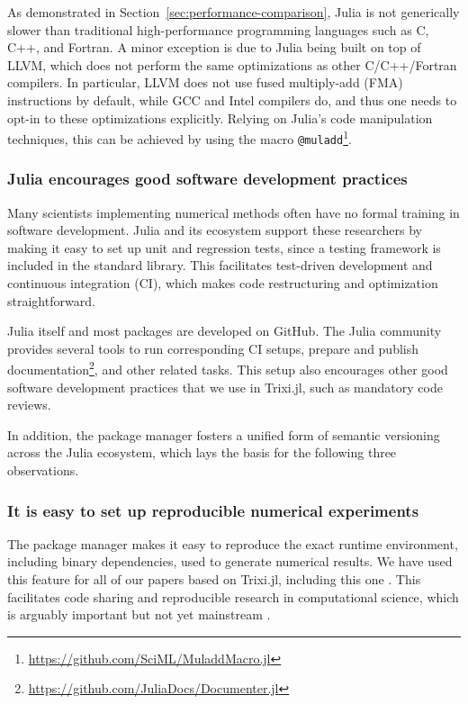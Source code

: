 \documentclass[hidelinks]{juliacon} %
\newcommand{\trixi}{Trixi.jl\xspace}
\begin{document}
As demonstrated in Section~\ref{sec:performance-comparison},
Julia is not generically slower than traditional high-performance programming
languages such as C, C++, and Fortran. A minor exception is due to
Julia being built on top of LLVM, which does not perform the same optimizations as other
C/C++/Fortran compilers. In particular, LLVM does
not use fused multiply-add (FMA) instructions by default, while GCC and Intel
compilers do, and thus one needs to opt-in to these optimizations explicitly.
Relying on Julia's code manipulation techniques, this can be achieved by using the macro
\lstinline{@muladd}\footnote{\url{https://github.com/SciML/MuladdMacro.jl}}.

\subsubsection{Julia encourages good software development practices}

Many scientists implementing numerical methods often have no formal training
in software development. Julia and its ecosystem support these
researchers by making it easy to set up unit and regression tests, since a
testing framework is included in the standard library. This facilitates test-driven
development and continuous integration (CI), which makes code restructuring
and optimization straightforward.

Julia itself and most packages are developed on GitHub. The Julia community provides
several tools to run corresponding CI setups, prepare and publish
documentation\footnote{\url{https://github.com/JuliaDocs/Documenter.jl}},
and other related tasks. This setup also encourages other good software development
practices that we use in \trixi, such as mandatory code reviews.

In addition, the package manager fosters a unified form of semantic versioning
across the Julia ecosystem, which lays the basis for the following three
observations.

\subsubsection{It is easy to set up reproducible numerical experiments}

The package manager makes it easy to reproduce the exact runtime environment, including
binary dependencies, used to generate numerical results. We have used this feature for all of our papers based on
\trixi \cite{schlottkelakemper2021purely, ranocha2021preventing}, including this
one \cite{ranocha2021adaptiveRepro}.
This facilitates code sharing and reproducible research in computational science,
which is arguably important but not yet mainstream \cite{barnes2010publish,
donoho2010invitation, leveque2013top}.
\end{document}
